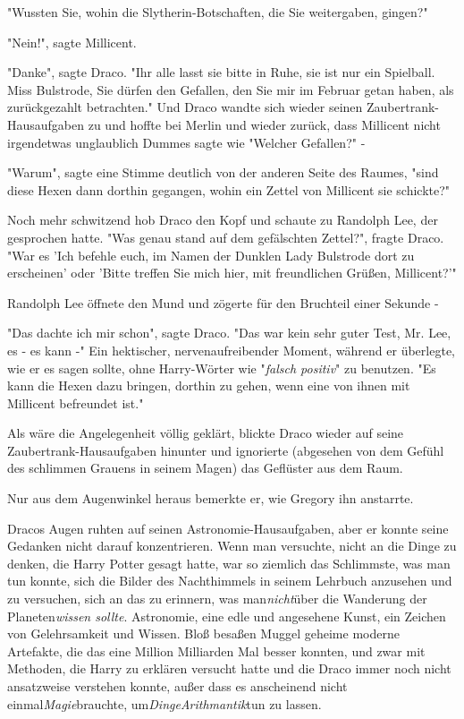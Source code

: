 {"Wussten Sie, wohin die Slytherin-Botschaften, die Sie weitergaben, gingen?"

"Nein!", sagte Millicent.

"Danke", sagte Draco. "Ihr alle lasst sie bitte in Ruhe, sie ist nur ein Spielball. Miss Bulstrode, Sie dürfen den Gefallen, den Sie mir im Februar getan haben, als zurückgezahlt betrachten." Und Draco wandte sich wieder seinen Zaubertrank-Hausaufgaben zu und hoffte bei Merlin und wieder zurück, dass Millicent nicht irgendetwas unglaublich Dummes sagte wie "Welcher Gefallen?" -

"Warum", sagte eine Stimme deutlich von der anderen Seite des Raumes, "sind diese Hexen dann dorthin gegangen, wohin ein Zettel von Millicent sie schickte?"

Noch mehr schwitzend hob Draco den Kopf und schaute zu Randolph Lee, der gesprochen hatte. "Was genau stand auf dem gefälschten Zettel?", fragte Draco. "War es 'Ich befehle euch, im Namen der Dunklen Lady Bulstrode dort zu erscheinen' oder 'Bitte treffen Sie mich hier, mit freundlichen Grüßen, Millicent?'"

Randolph Lee öffnete den Mund und zögerte für den Bruchteil einer Sekunde -

"Das dachte ich mir schon", sagte Draco. "Das war kein sehr guter Test, Mr. Lee, es - es kann -" Ein hektischer, nervenaufreibender Moment, während er überlegte, wie er es sagen sollte, ohne Harry-Wörter wie "\emph{falsch positiv}" zu benutzen. "Es kann die Hexen dazu bringen, dorthin zu gehen, wenn eine von ihnen mit Millicent befreundet ist."

Als wäre die Angelegenheit völlig geklärt, blickte Draco wieder auf seine Zaubertrank-Hausaufgaben hinunter und ignorierte (abgesehen von dem Gefühl des schlimmen Grauens in seinem Magen) das Geflüster aus dem Raum.

Nur aus dem Augenwinkel heraus bemerkte er, wie Gregory ihn anstarrte.

Dracos Augen ruhten auf seinen Astronomie-Hausaufgaben, aber er konnte seine Gedanken nicht darauf konzentrieren. Wenn man versuchte, nicht an die Dinge zu denken, die Harry Potter gesagt hatte, war so ziemlich das Schlimmste, was man tun konnte, sich die Bilder des Nachthimmels in seinem Lehrbuch anzusehen und zu versuchen, sich an das zu erinnern, was man\emph{nicht}über die Wanderung der Planeten\emph{wissen sollte}. Astronomie, eine edle und angesehene Kunst, ein Zeichen von Gelehrsamkeit und Wissen. Bloß besaßen Muggel geheime moderne Artefakte, die das eine Million Milliarden Mal besser konnten, und zwar mit Methoden, die Harry zu erklären versucht hatte und die Draco immer noch nicht ansatzweise verstehen konnte, außer dass es anscheinend nicht einmal\emph{Magie}brauchte, um\emph{DingeArithmantik}tun zu lassen.

}
